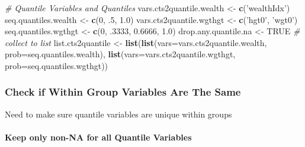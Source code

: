 \documentclass[
]{book}
\newenvironment{Shaded}{\begin{snugshade}}{\end{snugshade}}
\newcommand{\CommentTok}[1]{\textcolor[rgb]{0.56,0.35,0.01}{\textit{#1}}}
\newcommand{\ControlFlowTok}[1]{\textcolor[rgb]{0.13,0.29,0.53}{\textbf{#1}}}
\newcommand{\DataTypeTok}[1]{\textcolor[rgb]{0.13,0.29,0.53}{#1}}
\newcommand{\DecValTok}[1]{\textcolor[rgb]{0.00,0.00,0.81}{#1}}
\newcommand{\FloatTok}[1]{\textcolor[rgb]{0.00,0.00,0.81}{#1}}
\newcommand{\KeywordTok}[1]{\textcolor[rgb]{0.13,0.29,0.53}{\textbf{#1}}}
\newcommand{\NormalTok}[1]{#1}
\newcommand{\OperatorTok}[1]{\textcolor[rgb]{0.81,0.36,0.00}{\textbf{#1}}}
\newcommand{\OtherTok}[1]{\textcolor[rgb]{0.56,0.35,0.01}{#1}}
\newcommand{\StringTok}[1]{\textcolor[rgb]{0.31,0.60,0.02}{#1}}
\begin{document}
\begin{Shaded}
\begin{Highlighting}[]
\CommentTok{# Quantile Variables and Quantiles}
\NormalTok{vars.cts2quantile.wealth <-}\StringTok{ }\KeywordTok{c}\NormalTok{(}\StringTok{'wealthIdx'}\NormalTok{)}
\NormalTok{seq.quantiles.wealth <-}\StringTok{ }\KeywordTok{c}\NormalTok{(}\DecValTok{0}\NormalTok{, }\FloatTok{.5}\NormalTok{, }\FloatTok{1.0}\NormalTok{)}
\NormalTok{vars.cts2quantile.wgthgt <-}\StringTok{ }\KeywordTok{c}\NormalTok{(}\StringTok{'hgt0'}\NormalTok{, }\StringTok{'wgt0'}\NormalTok{)}
\NormalTok{seq.quantiles.wgthgt <-}\StringTok{ }\KeywordTok{c}\NormalTok{(}\DecValTok{0}\NormalTok{, }\FloatTok{.3333}\NormalTok{, }\FloatTok{0.6666}\NormalTok{, }\FloatTok{1.0}\NormalTok{)}
\NormalTok{drop.any.quantile.na <-}\StringTok{ }\OtherTok{TRUE}
\CommentTok{# collect to list}
\NormalTok{list.cts2quantile <-}\StringTok{ }\KeywordTok{list}\NormalTok{(}\KeywordTok{list}\NormalTok{(}\DataTypeTok{vars=}\NormalTok{vars.cts2quantile.wealth,}
                               \DataTypeTok{prob=}\NormalTok{seq.quantiles.wealth),}
                          \KeywordTok{list}\NormalTok{(}\DataTypeTok{vars=}\NormalTok{vars.cts2quantile.wgthgt,}
                               \DataTypeTok{prob=}\NormalTok{seq.quantiles.wgthgt))}
\end{Highlighting}
\end{Shaded}

\hypertarget{check-if-within-group-variables-are-the-same}{%
\subsubsection{Check if Within Group Variables Are The Same}\label{check-if-within-group-variables-are-the-same}}

Need to make sure quantile variables are unique within groups

\begin{Shaded}
\end{Shaded}

\hypertarget{keep-only-non-na-for-all-quantile-variables}{%
\paragraph{Keep only non-NA for all Quantile Variables}\label{keep-only-non-na-for-all-quantile-variables}}
\end{document}
